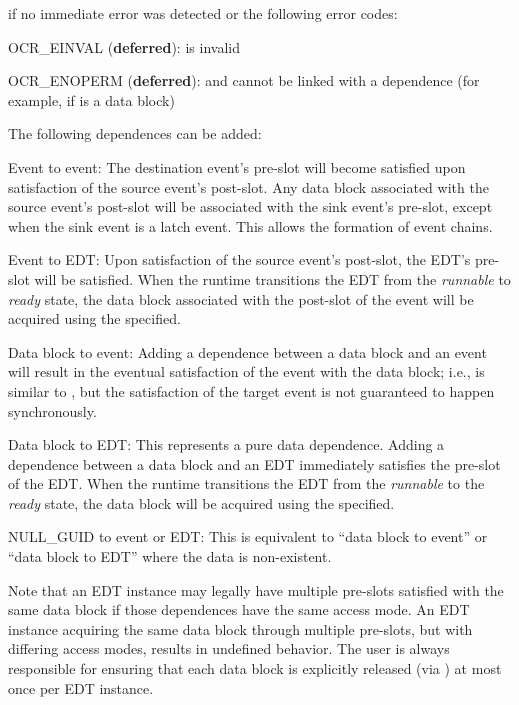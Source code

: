  if no immediate error was detected or the following error codes:
\begin{DoxyItemize}
\item OCR\_EINVAL ({\bf deferred}):  is invalid
\item OCR\_ENOPERM ({\bf deferred}):  and  cannot be linked with
  a dependence (for example, if  is a data block)
\end{DoxyItemize}

\descr
The following dependences can be added:
\begin{DoxyItemize}
\item Event to event: The destination event's pre-slot will become satisfied
  upon satisfaction of the source event's post-slot. Any data block associated
  with the source event's post-slot will be associated with the sink event's pre-slot,
  except when the sink event is a latch event. This allows the formation of event chains.
\item Event to EDT: Upon satisfaction of the source event's post-slot, the EDT's
  pre-slot will be satisfied. When the runtime transitions the EDT from the
  \emph{runnable} to \emph{ready} state, the data block associated with the
  post-slot of the event will be acquired using the  specified.
\item Data block to event: Adding a dependence between a data block and an
  event will result in the eventual satisfaction of the event with the data block;
  i.e.,  is
  similar to \hyperlink{func_ocrEventSatisfySlot}{
  },
  but the satisfaction of the target event is not guaranteed to happen synchronously.
\item Data block to EDT: This represents a pure data dependence. Adding a
  dependence between a data block and an EDT immediately satisfies the pre-slot
  of the EDT. When the runtime transitions the EDT from the \emph{runnable}
  to the \emph{ready} state, the data block will be acquired using the
   specified.
\item NULL\_GUID to event or EDT: This is equivalent to ``data block to event''
  or ``data block to EDT'' where the data is non-existent.
\end{DoxyItemize}

Note that an EDT instance may legally have multiple pre-slots satisfied with the same
data block if those dependences have the same access mode. An EDT instance acquiring the
same data block through multiple pre-slots, but with differing access modes, results in
undefined behavior. The user is always responsible for ensuring that each data block is
explicitly released (via \hyperlink{func_ocrDbRelease}{}) at most once
per EDT instance.

